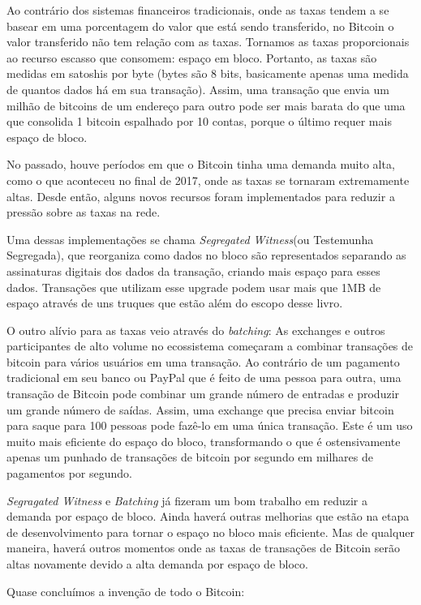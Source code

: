 Ao contrário dos sistemas financeiros tradicionais, onde as taxas tendem a se basear em uma porcentagem do valor que está sendo transferido, no Bitcoin o valor transferido não tem relação com as taxas. Tornamos as taxas proporcionais ao recurso escasso que consomem: espaço em bloco. Portanto, as taxas são medidas em satoshis por byte (bytes são 8 bits, basicamente apenas uma medida de quantos dados há em sua transação). Assim, uma transação que envia um milhão de bitcoins de um endereço para outro pode ser mais barata do que uma que consolida 1 bitcoin espalhado por 10 contas, porque o último requer mais espaço de bloco.

No passado, houve períodos em que o Bitcoin tinha uma demanda muito alta, como o que aconteceu no final de 2017, onde as taxas se tornaram extremamente altas. Desde então, alguns novos recursos foram implementados para reduzir a pressão sobre as taxas na rede.

Uma dessas implementações se chama \textit{Segregated Witness}(ou Testemunha Segregada), que reorganiza como dados no bloco são representados separando as assinaturas digitais dos dados da transação, criando mais espaço para esses dados. Transações que utilizam esse upgrade podem usar mais que 1MB de espaço através de uns truques que estão além do escopo desse livro.

O outro alívio para as taxas veio através do \textit{batching}: As exchanges e outros participantes de alto volume no ecossistema começaram a combinar transações de bitcoin para vários usuários em uma transação. Ao contrário de um pagamento tradicional em seu banco ou PayPal que é feito de uma pessoa para outra, uma transação de Bitcoin pode combinar um grande número de entradas e produzir um grande número de saídas. Assim, uma exchange que precisa enviar bitcoin para saque para 100 pessoas pode fazê-lo em uma única transação. Este é um uso muito mais eficiente do espaço do bloco, transformando o que é ostensivamente apenas um punhado de transações de bitcoin por segundo em milhares de pagamentos por segundo.

\textit{Segragated Witness} e \textit{Batching} já fizeram um bom trabalho em reduzir a demanda por espaço de bloco. Ainda haverá outras melhorias que estão na etapa de desenvolvimento para tornar o espaço no bloco mais eficiente. Mas de qualquer maneira, haverá outros momentos onde as taxas de transações de Bitcoin serão altas novamente devido a alta demanda por espaço de bloco.


Quase concluímos a invenção de todo o Bitcoin:

